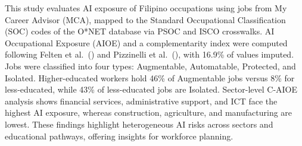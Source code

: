 This study evaluates AI exposure of Filipino occupations using jobs from My Career Advisor (MCA), 
mapped to the Standard Occupational Classification (SOC) codes of the O*NET database via PSOC and ISCO crosswalks. 
AI Occupational Exposure (AIOE) and a complementarity index were computed following Felten et al.\ (\citeyear{felten2021}) and Pizzinelli et al.\ (\citeyear{Pizzinelli2023Labor}), with 16.9\% of values imputed. 
Jobs were classified into four types: Augmentable, Automatable, Protected, and Isolated. 
Higher-educated workers hold 46\% of Augmentable jobs versus 8\% for less-educated, while 43\% of less-educated jobs are Isolated. 
Sector-level C-AIOE analysis shows financial services, administrative support, and ICT face the highest AI exposure, whereas construction, agriculture, and manufacturing are lowest. 
These findings highlight heterogeneous AI risks across sectors and educational pathways, offering insights for workforce planning.
